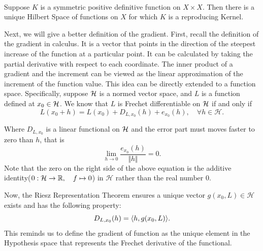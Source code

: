 \begin{Theorem} \ \\
Suppose $K$ is a symmetric positive definitive function on $X \times X$. Then there is a unique Hilbert Space of functions on $X$ for which $K$ is a reproducing Kernel.
	
\end{Theorem}

Next, we will give a better definition of the gradient. First, recall the definition of the gradient in calculus. It is a vector that points in the direction of the steepest increase of the function at a particular point. It can be calculated by taking the partial derivative with respect to each coordinate. The inner product of a gradient and the increment can be viewed as the linear approximation of the increment of the function value. This idea can be directly extended to a function space. Specifically, suppose $\mathcal{H}$ is a normed vector space, and $L$ is a function defined at $x_0 \in \mathcal{H}$. We know that $L$ is Frechet differentiable on $\mathcal{H}$ if and only if 
\begin{equation} \label{frechet}
	L(x_0 + h) = L(x_0) + D_{L,x_0}(h) + e_{x_0}(h), \quad \forall h \in \mathcal{H}.
\end{equation}

Where $D_{L,x_0}$ is a linear functional on $\mathcal{H}$ and the error part must moves faster to zero than $h$, that is 
$$\lim_{h \to 0} \frac{e_{x_0} (h)}{\Vert h \Vert} = 0.$$
Note that the zero on the right side of the above equation is the additive identity($0: \mathcal{H} \to \mathbb{R},\quad f \mapsto 0$) in $\mathcal{H}$ rather than the real number $0$.

Now, the Riesz Representation Theorem ensures a unique vector $g(x_0,L) \in \mathcal{H}$ exists and has the following property:
$$
D_{L,x_0}(h) = {\langle h,g(x_0,L)\rangle}.
$$ 
This reminds us to define the gradient of function as the unique element in the Hypothesis space that represents the Frechet derivative of the functional.

